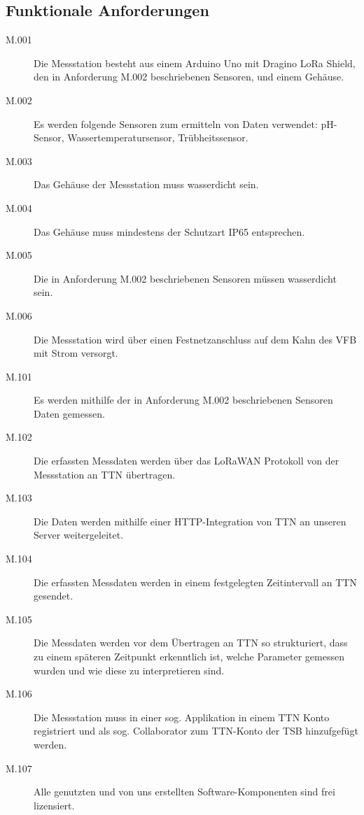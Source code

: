 \subsection{Funktionale Anforderungen}\label{subsec:func_require}

\begin{description}
	\item[M.001]
		Die Messstation besteht aus einem Arduino Uno mit Dragino LoRa Shield, den in
		Anforderung M.002 beschriebenen Sensoren, und einem Gehäuse.

	\item[M.002]
		Es werden folgende Sensoren zum ermitteln von Daten verwendet: pH-Sensor,
		Wassertemperatursensor, Trübheitssensor.

	\item[M.003]
		Das Gehäuse der Messstation muss wasserdicht sein.

	\item[M.004]
		Das Gehäuse muss mindestens der Schutzart IP65 entsprechen.

	\item[M.005]
		Die in Anforderung M.002 beschriebenen Sensoren müssen wasserdicht sein.

	\item[M.006]
		Die Messstation wird über einen Festnetzanschluss auf dem Kahn des VFB mit Strom versorgt.
\end{description}

\begin{description}
	\item[M.101]
		Es werden mithilfe der in Anforderung M.002 beschriebenen Sensoren Daten gemessen.

	\item[M.102]
		Die erfassten Messdaten werden über das LoRaWAN Protokoll von der Messstation
		an TTN übertragen.

	\item[M.103]
		Die Daten werden mithilfe einer HTTP-Integration von TTN an unseren Server
		weitergeleitet.

	\item[M.104]
		Die erfassten Messdaten werden in einem festgelegten Zeitintervall an TTN
		gesendet.

	\item[M.105]
		Die Messdaten werden vor dem Übertragen an TTN so strukturiert, dass zu einem
		späteren Zeitpunkt erkenntlich ist, welche Parameter gemessen wurden und wie
		diese zu interpretieren sind.

	\item[M.106]
		Die Messstation muss in einer sog. \glqq Applikation\grqq{} in einem TTN Konto
		registriert und als sog. \glqq Collaborator\grqq{} zum TTN-Konto der TSB
		hinzufgefügt werden.

	\item[M.107]
		Alle genutzten und von uns erstellten Software-Komponenten sind frei lizensiert.
\end{description}

